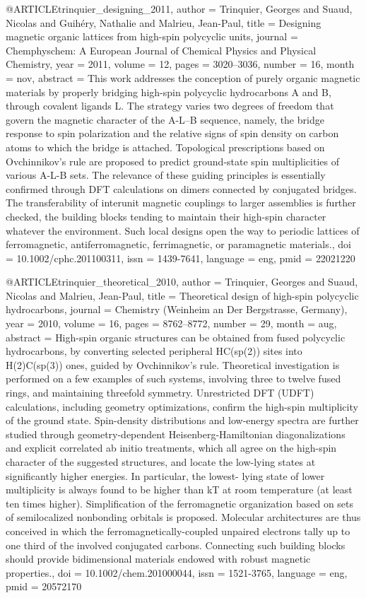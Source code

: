 @ARTICLE{trinquier_designing_2011,
  author = {Trinquier, Georges and Suaud, Nicolas and Guih\'ery, Nathalie and Malrieu,
	Jean-Paul},
  title = {Designing magnetic organic lattices from high-spin polycyclic units},
  journal = {Chemphyschem: A European Journal of Chemical Physics and Physical
	Chemistry},
  year = {2011},
  volume = {12},
  pages = {3020--3036},
  number = {16},
  month = nov,
  abstract = {This work addresses the conception of purely organic magnetic materials
	by properly bridging high-spin polycyclic hydrocarbons A and B, through
	covalent ligands L. The strategy varies two degrees of freedom that
	govern the magnetic character of the A-L--B sequence, namely, the
	bridge response to spin polarization and the relative signs of spin
	density on carbon atoms to which the bridge is attached. Topological
	prescriptions based on Ovchinnikov's rule are proposed to predict
	ground-state spin multiplicities of various A-L-B sets. The relevance
	of these guiding principles is essentially confirmed through DFT
	calculations on dimers connected by conjugated bridges. The transferability
	of interunit magnetic couplings to larger assemblies is further checked,
	the building blocks tending to maintain their high-spin character
	whatever the environment. Such local designs open the way to periodic
	lattices of ferromagnetic, antiferromagnetic, ferrimagnetic, or paramagnetic
	materials.},
  doi = {10.1002/cphc.201100311},
  issn = {1439-7641},
  language = {eng},
  pmid = {22021220}
}

@ARTICLE{trinquier_theoretical_2010,
  author = {Trinquier, Georges and Suaud, Nicolas and Malrieu, Jean-Paul},
  title = {Theoretical design of high-spin polycyclic hydrocarbons},
  journal = {Chemistry (Weinheim an Der Bergstrasse, Germany)},
  year = {2010},
  volume = {16},
  pages = {8762--8772},
  number = {29},
  month = aug,
  abstract = {High-spin organic structures can be obtained from fused polycyclic
	hydrocarbons, by converting selected peripheral HC(sp(2)) sites into
	H(2)C(sp(3)) ones, guided by Ovchinnikov's rule. Theoretical investigation
	is performed on a few examples of such systems, involving three to
	twelve fused rings, and maintaining threefold symmetry. Unrestricted
	DFT (UDFT) calculations, including geometry optimizations, confirm
	the high-spin multiplicity of the ground state. Spin-density distributions
	and low-energy spectra are further studied through geometry-dependent
	Heisenberg-Hamiltonian diagonalizations and explicit correlated ab
	initio treatments, which all agree on the high-spin character of
	the suggested structures, and locate the low-lying states at significantly
	higher energies. In particular, the lowest- lying state of lower
	multiplicity is always found to be higher than kT at room temperature
	(at least ten times higher). Simplification of the ferromagnetic
	organization based on sets of semilocalized nonbonding orbitals is
	proposed. Molecular architectures are thus conceived in which the
	ferromagnetically-coupled unpaired electrons tally up to one third
	of the involved conjugated carbons. Connecting such building blocks
	should provide bidimensional materials endowed with robust magnetic
	properties.},
  doi = {10.1002/chem.201000044},
  issn = {1521-3765},
  language = {eng},
  pmid = {20572170}
}

